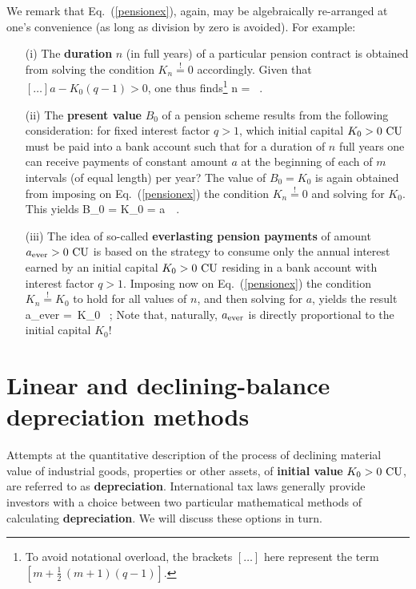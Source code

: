\medskip
\noindent
We remark that Eq.~(\ref{pensionex}), again, may be algebraically 
re-arranged at one's convenience (as long as division by zero is 
avoided). For example:
%
\begin{itemize}

\item[(i)] The {\bf duration} $n$ (in full years) of a particular 
pension contract is obtained from solving the condition 
$K_{n}\stackrel{!}{=}0$ accordingly. Given that 
$[\ldots]a-K_{0}(q-1)>0$, one thus finds\footnote{To avoid 
notational overload, the brackets $[\ldots]$ here represent the 
term $\left[m+\frac{1}{2}\,(m+1)(q-1)\right]$.}
%
\be
{}
n =  \ .
\ee
%

\item[(ii)] The {\bf present value} $B_{0}$ of a pension scheme 
results from the following consideration: for fixed interest 
factor $q>1$, which initial capital $K_{0} > 0~{\rm CU}$ must be 
paid into a bank account such that for a duration of $n$ full 
years one can receive payments of constant amount $a$ at the 
beginning of each of $m$ intervals (of equal length) per year? The 
value of $B_{0}=K_{0}$ is again obtained from imposing on 
Eq.~(\ref{pensionex}) the condition $K_{n}\stackrel{!}{=}0$ and 
solving for $K_{0}$. This yields
%
\be
{}
B_{0} = K_{0} = a\,
 \ .
\ee
%

\item[(iii)] The idea of so-called {\bf everlasting pension 
payments} of amount $a_{\rm ever} >0~{\rm CU}$ is based on the 
strategy to consume only the annual interest earned by an initial 
capital $K_{0}>0~{\rm CU}$ residing in a bank account with 
interest factor $q>1$. Imposing now on Eq.~(\ref{pensionex}) the 
condition $K_{n}\stackrel{!}{=}K_{0}$ to hold for all values of 
$n$, and then solving for $a$, yields the result
%
\be
a_{\rm ever} = \,K_{0} \ ;
\ee
%
Note that, naturally, $a_{\rm ever}$ is directly proportional to 
the initial capital $K_{0}$!

\end{itemize}
%

\section[Linear and declining-balance depreciation methods]%
{Linear and declining-balance depreciation methods}
Attempts at the quantitative description of the process of 
declining material value of industrial goods, properties or other 
assets, of {\bf initial value} $K_{0}>0~{\rm CU}$, are referred to 
as {\bf depreciation}. International tax laws generally provide 
investors with a choice between two particular mathematical 
methods of calculating {\bf depreciation}. We will discuss 
these options in turn.

